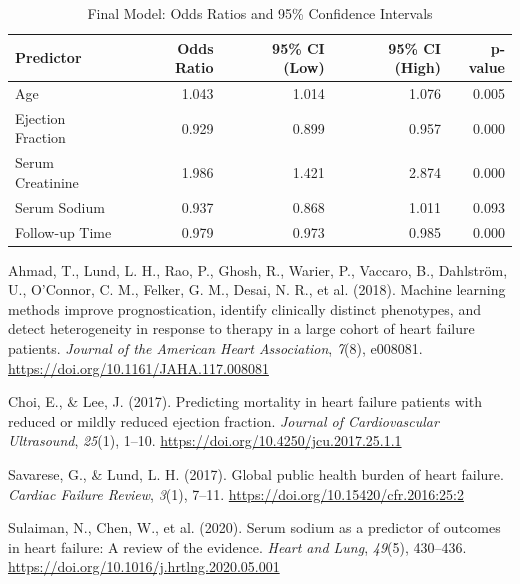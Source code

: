 \documentclass[
  letterpaper,
  DIV=11,
  numbers=noendperiod]{scrartcl}
\newlength{\cslhangindent}
\newlength{\cslentryspacingunit} %
\newenvironment{CSLReferences}[2] %
 {%
  \setlength{\parindent}{0pt}
  \ifodd #1
  \let\oldpar\par
  \def\par{\hangindent=\cslhangindent\oldpar}
  \fi
  \setlength{\parskip}{#2\cslentryspacingunit}
 }%
 {}
\begin{document}
\begin{longtable}[t]{lrrrr}
\caption{Final Model: Odds Ratios and 95\% Confidence Intervals}\\
\toprule
Predictor & Odds Ratio & 95\% CI (Low) & 95\% CI (High) & p-value\\
\midrule
Age & 1.043 & 1.014 & 1.076 & 0.005\\
Ejection Fraction & 0.929 & 0.899 & 0.957 & 0.000\\
Serum Creatinine & 1.986 & 1.421 & 2.874 & 0.000\\
Serum Sodium & 0.937 & 0.868 & 1.011 & 0.093\\
Follow-up Time & 0.979 & 0.973 & 0.985 & 0.000\\
\bottomrule
\end{longtable}

\hypertarget{refs}{}
\begin{CSLReferences}{1}{0}
\leavevmode{}%
Ahmad, T., Lund, L. H., Rao, P., Ghosh, R., Warier, P., Vaccaro, B.,
Dahlström, U., O'Connor, C. M., Felker, G. M., Desai, N. R., et al.
(2018). Machine learning methods improve prognostication, identify
clinically distinct phenotypes, and detect heterogeneity in response to
therapy in a large cohort of heart failure patients. \emph{Journal of
the American Heart Association}, \emph{7}(8), e008081.
\url{https://doi.org/10.1161/JAHA.117.008081}

\leavevmode{}%
Choi, E., \& Lee, J. (2017). Predicting mortality in heart failure
patients with reduced or mildly reduced ejection fraction. \emph{Journal
of Cardiovascular Ultrasound}, \emph{25}(1), 1--10.
\url{https://doi.org/10.4250/jcu.2017.25.1.1}

\leavevmode{}%
Savarese, G., \& Lund, L. H. (2017). Global public health burden of
heart failure. \emph{Cardiac Failure Review}, \emph{3}(1), 7--11.
\url{https://doi.org/10.15420/cfr.2016:25:2}

\leavevmode{}%
Sulaiman, N., Chen, W., et al. (2020). Serum sodium as a predictor of
outcomes in heart failure: A review of the evidence. \emph{Heart and
Lung}, \emph{49}(5), 430--436.
\url{https://doi.org/10.1016/j.hrtlng.2020.05.001}

\end{CSLReferences}
\end{document}
